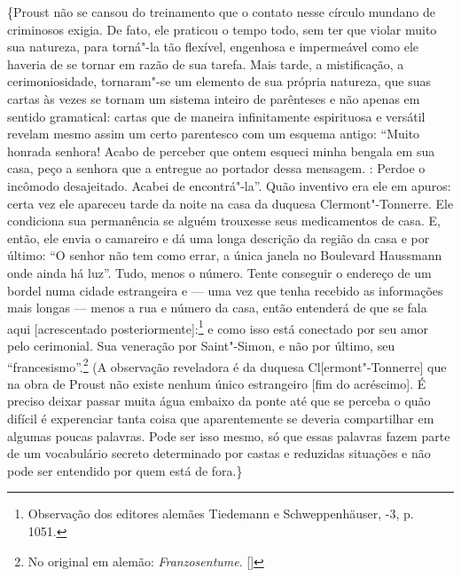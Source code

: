 \{Proust não se cansou do treinamento que o contato nesse círculo
mundano de criminosos exigia. De fato, ele praticou o tempo todo, sem
ter que violar muito sua natureza, para torná"-la tão flexível, engenhosa
e impermeável como ele haveria de se tornar em razão de sua tarefa.
Mais tarde, a mistificação, a cerimoniosidade, tornaram"-se um elemento de
sua própria natureza, que suas cartas às vezes se tornam um sistema
inteiro de parênteses e não apenas em sentido gramatical: cartas que de
maneira infinitamente espirituosa e versátil revelam mesmo assim um
certo parentesco com um esquema antigo: ``Muito honrada senhora! Acabo
de perceber que ontem esqueci minha bengala em sua casa, peço a senhora
que a entregue ao portador dessa mensagem. : Perdoe o incômodo
desajeitado. Acabei de encontrá"-la''. Quão inventivo era ele em apuros:
certa vez ele apareceu tarde da noite na casa da duquesa
Clermont"-Tonnerre. Ele condiciona sua permanência se alguém trouxesse
seus medicamentos de casa. E, então, ele envia o camareiro e dá uma
longa descrição da região da casa e por último: ``O senhor não tem como
errar, a única janela no Boulevard Haussmann onde ainda há luz''. Tudo,
menos o número. Tente conseguir o endereço de um bordel numa cidade
estrangeira e --- uma vez que tenha recebido as informações mais longas ---
menos a rua e número da casa, então entenderá de que se fala aqui
{[}acrescentado posteriormente{]}:\footnote{Observação dos editores
  alemães Tiedemann e Schweppenhäuser, -3, p. 1051. \versal{[N. E.]}} e
como isso está conectado por seu amor pelo cerimonial. Sua veneração por
Saint"-Simon, e não por último, seu ``francesismo''.\footnote{No original em alemão: \emph{Franzosentume}. []}
(A observação reveladora é da duquesa Cl{[}ermont"-Tonnerre{]} que na
obra de Proust não existe nenhum único estrangeiro {[}fim do
acréscimo{]}. É preciso deixar passar muita água embaixo da ponte até
que se perceba o quão difícil é experenciar tanta coisa que
aparentemente se deveria compartilhar em algumas poucas palavras. Pode
ser isso mesmo, só que essas palavras fazem parte de um vocabulário
secreto determinado por castas e reduzidas situações e não pode ser
entendido por quem está de fora.\}

